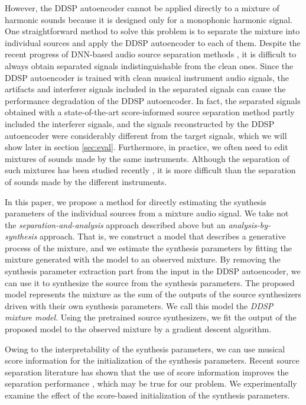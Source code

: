 \documentclass{article}
\begin{document}
However, the DDSP autoencoder cannot be applied directly to a mixture of harmonic sounds because it is designed only for a monophonic harmonic signal.
One straightforward method to solve this problem is to separate the mixture into individual sources and apply the DDSP autoencoder to each of them.
Despite the recent progress of DNN-based audio source separation methods \cite{bunrireport}, 
it is difficult to always obtain separated signals indistinguishable from the clean ones.
Since the DDSP autoencoder is trained with clean musical instrument audio signals, the artifacts and interferer signals included in the separated signals can cause the performance degradation of the DDSP autoencoder.
In fact, the separated signals obtained with a state-of-the-art score-informed source separation method partly included the interferer signals, and the signals reconstructed by the DDSP autoencoder were considerably different from the target signals, which we will show later in section \ref{sec:eval}.
Furthermore, in practice, we often need to edit mixtures of sounds made by the same instruments. Although the separation of such mixtures has been studied recently \cite{A1,A2}, it is more difficult than the separation of sounds made by the different instruments.

In this paper, we propose a method for directly estimating the synthesis parameters of the individual sources from a mixture audio signal. We take not the \textit{separation-and-analysis} approach described above but an \textit{analysis-by-synthesis} approach.
That is, we construct a model that describes a generative process of the mixture, and we estimate the synthesis parameters by fitting the mixture generated with the model to an observed mixture.
By removing the synthesis parameter extraction part from the input in the DDSP autoencoder, we can use it to synthesize the source from the synthesis parameters.
The proposed model represents the mixture as the sum of the outputs of the source synthesizers driven with their own synthesis parameters. We call this model the \textit{DDSP mixture model}.
Using the pretrained source synthesizers, we fit the output of the proposed model to the observed mixture by a gradient descent algorithm.

Owing to the interpretability of the synthesis parameters,
we can use musical score information for the initialization of the synthesis parameters.
Recent source separation literature has shown that the use of score information improves the separation performance \cite{gakuhukouka1, gakuhukouka2, gakuhukouka3,simsd}, which may be true for our problem. We experimentally examine the effect of the score-based initialization of the synthesis parameters.
\end{document}
